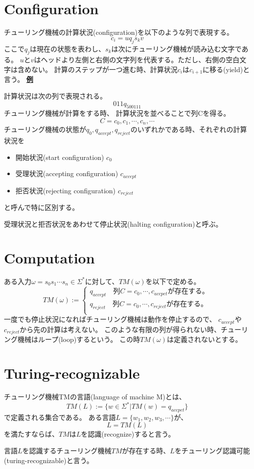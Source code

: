 \documentclass[b5paper,fleqn]{ltjsarticle}
\newcommand\ex[1]{\vskip5pt\underline{\bf 例}\quad#1\par}
\begin{document}
\section{Configuration}
チューリング機械の計算状況(configuration)を以下のような列で表現する。
\[c_i=uq_js_kv\]
ここで$q_j$は現在の状態を表わし、$s_k$は次にチューリング機械が読み込む文字である。
$u$と$v$はヘッドより左側と右側の文字列を代表する。ただし、右側の空白文字は含めない。
計算のステップが一つ進む時、計算状況$c_i$は$c_{i+1}$に移る(yield)と言う。
\ex{}

\noindent 計算状況は次の列で表現される。
\[011q_500111\]
チューリング機械が計算をする時、
計算状況を並べることで列Cを得る。
\[C=c_0,c_1,\cdots,c_n,\cdots\]
チューリング機械の状態が$q_0,q_{accept},q_{reject}$のいずれかである時、それぞれの計算状況を
\begin{itemize}
\item 開始状況(start configuration)     $c_0$
\item 受理状況(accepting configuration) $c_{accept}$ 
\item 拒否状況(rejecting configuration) $c_{reject}$
\end{itemize}
と呼んで特に区別する。\par
受理状況と拒否状況をあわせて停止状況(halting configuration)と呼ぶ。

\section{Computation}
ある入力$\omega=s_0s_1\cdots s_n\in\Sigma^*$に対して、$TM(\omega)$を以下で定める。
\[TM(\omega):=
\begin{cases}
q_{accept}\quad\text{列$C=c_0,\cdots,c_{accpet}$が存在する。}\\
q_{reject}\quad\text{列$C=c_0,\cdots,c_{reject}$が存在する。}\\
\end{cases}
\]
一度でも停止状況になればチューリング機械は動作を停止するので、
$c_{accept}$や$c_{reject}$から先の計算は考えない。
このような有限の列が得られない時、チューリング機械はループ(loop)するという。
この時$TM(\omega)$は定義されないとする。

\section{Turing-recognizable}
チューリング機械TMの言語(language of machine M)とは、
\[TM(L):=\{w\in \Sigma^*|TM(w)=q_{accpet}\}\]
で定義される集合である。
ある言語$L=\{w_1,w_2,w_3,\cdots\}$が、
\[L=TM(L)\]
を満たすならば、$TM$は$L$を認識(recognize)すると言う。\par
言語$L$を認識するチューリング機械$TM$が存在する時、$L$をチューリング認識可能(turing-recognizable)と言う。
\end{document}
